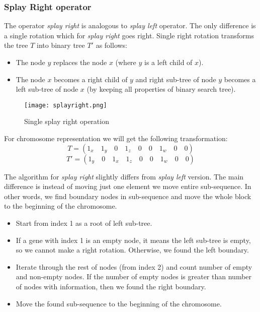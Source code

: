 \documentclass[12pt]{article}
\begin{document}


\subsubsection{Splay Right operator}

The operator \textit{splay right} is analogous to \textit{splay left} operator. The only difference is a single rotation which for \textit{splay right} goes right.
Single right rotation transforms the tree $T$ into binary tree $T'$ as follows:
\begin{itemize}
\item The node $y$ replaces the node $x$ (where $y$ is a left child of $x$).
\item The node $x$ becomes a right child of $y$ and right sub-tree of node $y$ becomes a left sub-tree of node $x$ (by keeping all properties of binary search tree).
\end{itemize}

\begin{figure}[ht]
\centering
\texttt{[image: splayright.png]}
\caption{Single splay right operation}
\label{fig:splayright}
\end{figure}

For chromosome representation we will get the following transformation:
\[
    T = (1_x \quad 1_y \quad 0 \quad 1_z \quad 0 \quad 0 \quad 1_w \quad 0 \quad 0)
\]
\[
    T' = (1_y \quad 0 \quad 1_x \quad 1_z \quad 0 \quad 0 \quad 1_w \quad 0 \quad 0)
\]

The algorithm for \textit{splay right} slightly differs from \textit{splay left} version.
The main difference is instead of moving just one element we move entire sub-sequence.
In other words, we find boundary nodes in sub-sequence and move the whole block to the beginning of the chromosome.

\begin{itemize}
\item Start from index 1 as a root of left sub-tree.
\item If a gene with index 1 is an empty node, it means the left sub-tree is empty, so we cannot make a right rotation. Otherwise, we found the left boundary.
\item Iterate through the rest of nodes (from index 2) and count number of empty and non-empty nodes.
If the number of empty nodes is greater than number of nodes with information, then we found the right boundary.
\item Move the found sub-sequence to the beginning of the chromosome.
\end{itemize}
\end{document}

